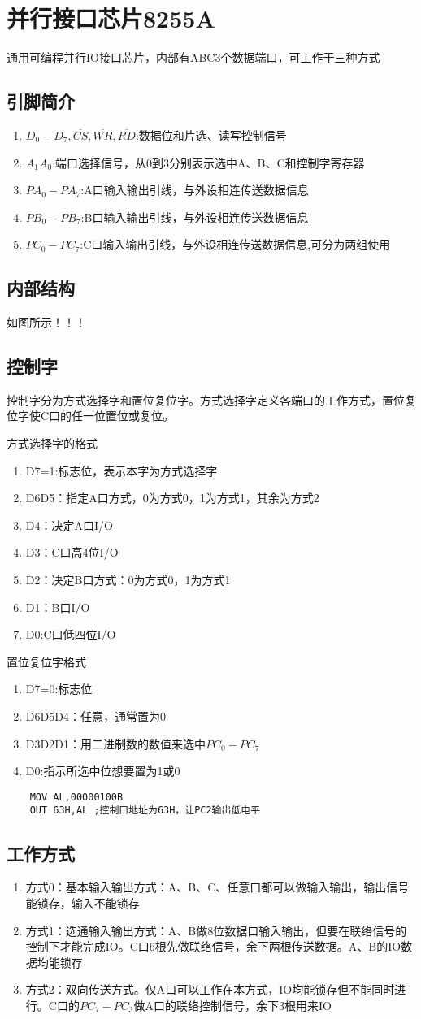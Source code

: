 \chapter{并行接口芯片8255A}
通用可编程并行IO接口芯片，内部有ABC3个数据端口，可工作于三种方式
\section{引脚简介}
\begin{enumerate}
    \item $D_0-D_7,\overline{CS},\overline{WR},\overline{RD}$:数据位和片选、读写控制信号
    \item $A_1A_0$:端口选择信号，从0到3分别表示选中A、B、C和控制字寄存器
    \item $PA_0-PA_7$:A口输入输出引线，与外设相连传送数据信息
    \item $PB_0-PB_7$:B口输入输出引线，与外设相连传送数据信息
    \item $PC_0-PC_7$:C口输入输出引线，与外设相连传送数据信息,可分为两组使用
\end{enumerate}
\section{内部结构}
如图所示！！！
\section{控制字}
控制字分为方式选择字和置位复位字。方式选择字定义各端口的工作方式，置位复位字使C口的任一位置位或复位。

方式选择字的格式
\begin{enumerate}
    \item D7=1:标志位，表示本字为方式选择字
    \item D6D5：指定A口方式，0为方式0，1为方式1，其余为方式2
    \item D4：决定A口I/O
    \item D3：C口高4位I/O
    \item D2：决定B口方式：0为方式0，1为方式1
    \item D1：B口I/O
    \item D0:C口低四位I/O
\end{enumerate}
置位复位字格式
\begin{enumerate}
    \item D7=0:标志位
    \item D6D5D4：任意，通常置为0
    \item D3D2D1：用二进制数的数值来选中$PC_0-PC_7$
    \item D0:指示所选中位想要置为1或0
\end{enumerate}
\begin{lstlisting}
    MOV AL,00000100B
    OUT 63H,AL ;控制口地址为63H，让PC2输出低电平
\end{lstlisting}
\section{工作方式}
\begin{enumerate}
    \item 方式0：基本输入输出方式：A、B、C、任意口都可以做输入输出，输出信号能锁存，输入不能锁存
    \item 方式1：选通输入输出方式：A、B做8位数据口输入输出，但要在联络信号的控制下才能完成IO。C口6根先做联络信号，余下两根传送数据。A、B的IO数据均能锁存
    \item 方式2：双向传送方式。仅A口可以工作在本方式，IO均能锁存但不能同时进行。C口的$PC_7-PC_3$做A口的联络控制信号，余下3根用来IO
\end{enumerate}
